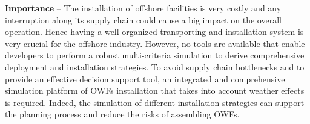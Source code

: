 \textbf{Importance} --
The installation of offshore facilities is very costly and any interruption along its supply chain could cause a big impact on the overall operation. Hence having a well organized transporting and installation system is very crucial for the offshore industry.
However, no tools are available that enable developers to perform a robust multi-criteria simulation to derive comprehensive deployment and installation strategies. To avoid supply chain bottlenecks and to provide an effective decision support tool, an integrated and comprehensive simulation platform of OWFs installation that takes into account weather effects is required. Indeed, the simulation of different installation strategies can support the planning process and reduce the risks of assembling OWFs.
